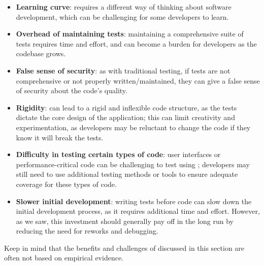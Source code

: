 \begin{itemize}
    \item \textbf{Learning curve}: \tdd requires a different way of thinking about software development, which can be challenging for some developers to learn.
    \item \textbf{Overhead of maintaining tests}: maintaining a comprehensive suite of tests requires time and effort, and can become a burden for developers as the codebase grows. 
    \item \textbf{False sense of security}: as with traditional testing, if tests are not comprehensive or not properly written/maintained, they can give a false sense of security about the code's quality.
    \item \textbf{Rigidity}: \tdd can lead to a rigid and inflexible code structure, as the tests dictate the core design of the application; this can limit creativity and experimentation, as developers may be reluctant to change the code if they know it will break the tests.
    \item \textbf{Difficulty in testing certain types of code}: user interfaces or performance-critical code can be challenging to test using \tdd; developers may still need to use additional testing methods or tools to ensure adequate coverage for these types of code.
    \item \textbf{Slower initial development}: writing tests before code can slow down the initial development process, as it requires additional time and effort. However, as we saw, this investment should generally pay off in the long run by reducing the need for reworks and debugging.
\end{itemize}

Keep in mind that the benefits and challenges of \tdd discussed in this section are often not based on empirical evidence.